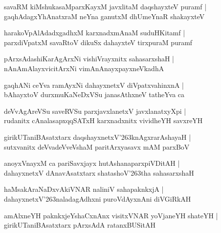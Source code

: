 \documentclass[twoside,12pt,openright]{book}
\def\S{\char'263}
\newcounter{shloka}[chapter]
\begin{document}
\begin{shloka}
savaRM kiMshukasaMparxKayxM javxlitaM daqshayxteV puramf |\\
gaqhAdagxYhAnatxraM neYna ganutxM dhUmeYnaR shakayxteV 
\end{shloka}

\begin{shloka}
harakoVpAlAdadxgadhxM karxnadxmAnaM suduHKitamf |\\
parxdiVpatxM savaRtoV dikuSx dahayxteV tirxpuraM puramf
\end{shloka}

\begin{shloka}
pArxsAdashiKarAgArxNi vishiVrayxnitx sahasarxshaH |\\
nAnAmAlayxvicitArxNi vimAnAnayxpayxneVkadhA 
\end{shloka}

\begin{shloka}
gaqhANi ceYva ramAyxNi dahayxnetxV diVpatxvahinxnA |\\
bAhayxtoV durxmuKaNeDxVSu janasAthxneV tatheYva ca 
\end{shloka}

\begin{shloka}
deVvAgAreVSu saveRVSu parxjavxlanetxV javxlanatxyXpi |\\
rudanitx cAnalasapxqqSATxH karxnadxnitx vividheYH savxreYH 
\end{shloka}

\begin{shloka}
girikUTaniBAsatxtarx daqshayxnetxV\S knAgxrarAshayaH |\\
sutxvanitx deVvadeVveVshaM paritArxyasavx mAM parxBoV 
\end{shloka}

\begin{shloka}
anoyxVnayxM ca pariSavxjayx hutAshanaparxpiVDitAH |\\
dahayxnetxV dAnavAsatxtarx shatashoV\S tha sahasarxshaH 
\end{shloka}

\begin{shloka}
haMsakAraNaDxvAkiVNAR naliniV sahapaknkxjA |\\
dahayxnetxV\S naladagAdhxni puroVdAyxnAni diVGiRkAH 
\end{shloka}

\begin{shloka}
amAlxneYH paknkxjeYshaCxnAnx visitxVNAR yoVjaneYH shateYH |\\
girikUTaniBAsatxtarx pArxsAdA ratanxBUSitAH 
\end{shloka}
\end{document}
